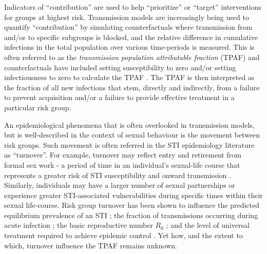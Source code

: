 \par %
Indicators of ``contribution'' are used to help ``prioritize'' or ``target'' interventions
for groups at highest risk. %
Transmission models are increasingly being used to quantify
``contribution'' by simulating counterfactuals where transmission 
from and/or to specific subgroups is blocked, and 
the relative difference in cumulative infections in the total population over 
various time-periods is measured. %
This is often referred to as the \textit{transmission population attributable fraction} (TPAF) 
and counterfactuals have included
setting susceptibility to zero and/or setting 
infectiousness to zero to calculate the TPAF \citep{Mishra2012}.
The TPAF is then interpreted as
the fraction of all new infections that stem,
directly and indirectly, from a failure to prevent acquisition and/or 
a failure to provide effective treatment in a particular risk group.		%
\par
An epidemiological phenomena that is often overlooked in transmission models, but
is well-described in the context of sexual behaviour 
is the movement between risk groups.						%
Such movement 
is often referred in the STI epidemiology literature as ``turnover''.  %
For example, turnover may reflect entry and retirement from	%
formal sex work - a period of time in an individual's sexual-life course
that represents a greater risk of STI susceptibility and 
onward transmission \citep{Watts2010}. Similarly, individuals 
may have a larger number of sexual partnerships or experience
greater STI-associated vulnerabilities during specific times
within their sexual life-course. %
Risk group turnover has been shown to 
influence the predicted equilibrium prevalence of an STI \citep{Stigum1994,Eaton2014};
the fraction of transmissions occurring during acute infection \citep{Zhang2012};		%
the basic reproductive number $R_0$ \citep{Henry2015}; and						%
the level of universal treatment required to achieve epidemic control \citep{Henry2015}.	%
Yet how, and the extent to which, turnover influence the TPAF remains unknown.

